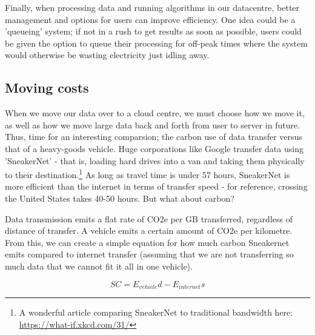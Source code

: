 \documentclass{article}
\begin{document}
Finally, when processing data and running algorithms in our datacentre, better management and options for users can improve efficiency. One idea could be a 'queueing' system; if not in a rush to get results as soon as possible, users could be given the option to queue their processing for off-peak times where the system would otherwise be wasting electricity just idling away.


\subsection{Moving costs}
When we move our data over to a cloud centre, we must choose how we move it, as well as how we move large data back and forth from user to server in future. Thus, time for an interesting comparsion; the carbon use of data transfer versus that of a heavy-goods vehicle. Huge corporations like Google transfer data using 'SneakerNet' - that is, loading hard drives into a van and taking them physically to their destination.\footnote{A wonderful article comparing SneakerNet to traditional bandwidth here: \href{https://what-if.xkcd.com/31/}{https://what-if.xkcd.com/31/}} As long as travel time is under 57 hours, SneakerNet is more efficient than the internet in terms of transfer speed \citep{jaya2020sneakernet} - for reference, crossing the United States takes 40-50 hours. But what about carbon? \newline

Data transmission emits a flat rate of CO2e per GB transferred, regardless of distance of transfer. A vehicle emits a certain amount of CO2e per kilometre. From this, we can create a simple equation for how much carbon Sneakernet emits compared to internet transfer (assuming that we are not transferring so much data that we cannot fit it all in one vehicle).

$$SC = E_{vehicle}d - E_{internet}s$$
\end{document}
